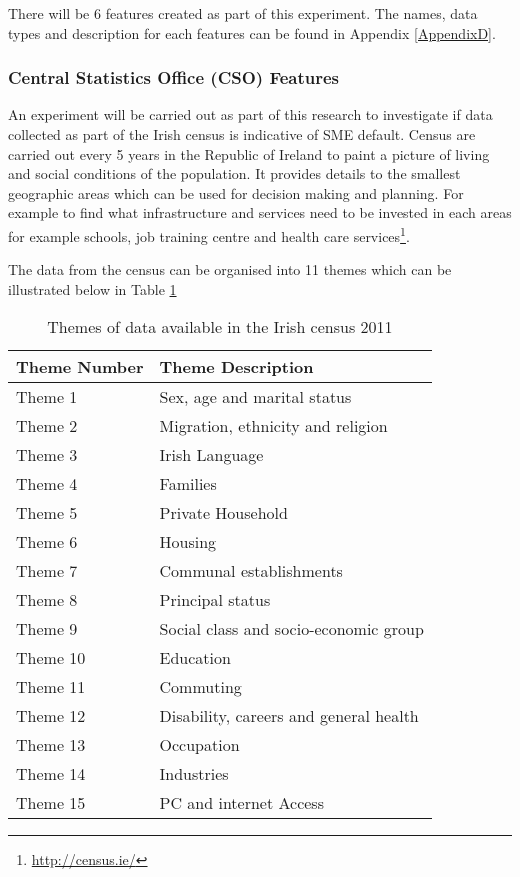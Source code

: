 There will be 6 features created as part of this experiment. The names, data types and description for each features can be found in Appendix \ref{AppendixD}.


\subsubsection{Central Statistics Office (CSO) Features}
An experiment will be carried out as part of this research to investigate if data collected as part of the Irish census is indicative of SME default. Census are carried out every 5 years in the Republic of Ireland to paint a picture of living and social conditions of the population. It provides details to the smallest geographic areas which can be used for decision making and planning. For example to find what infrastructure and services need to be invested in each areas for example schools, job training centre and health care services\footnote{\url{http://census.ie/}}. 

The data from the census can be organised into 11 themes which can be illustrated below in Table \ref{table:censusThemes}

\begin{table}[H]
	\centering
	\small
	\begin{tabular}{|l|l|}
		\hline
		\textbf{Theme Number} & \textbf{Theme Description} \\ \hline
		Theme 1    & Sex, age and marital status \\ \hline
		Theme 2    & Migration, ethnicity and religion \\ \hline
		Theme 3    & Irish Language \\ \hline
		Theme 4    & Families \\ \hline
		Theme 5    & Private Household \\ \hline
		Theme 6    & Housing \\ \hline
		Theme 7	   & Communal establishments \\ \hline
		Theme 8    & Principal status \\ \hline
		Theme 9    & Social class and socio-economic group \\ \hline
		Theme 10   & Education \\ \hline
		Theme 11   & Commuting \\ \hline	
		Theme 12   & Disability, careers and general health \\ \hline		
		Theme 13   & Occupation \\ \hline
		Theme 14   & Industries \\ \hline
		Theme 15   & PC and internet Access \\ \hline			
	\end{tabular}
	\caption{Themes of data available in the Irish census 2011}
	\label{table:censusThemes}
\end{table}


